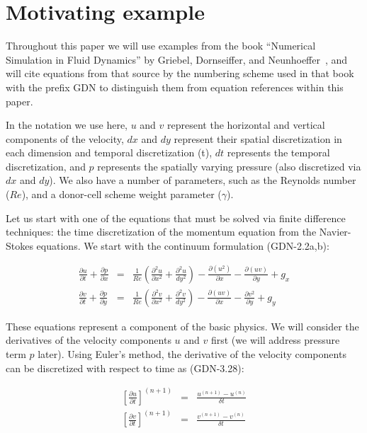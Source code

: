 \section{Motivating example}

Throughout this paper we will use examples from the book ``Numerical
Simulation in Fluid Dynamics'' by Griebel, Dornseiffer, and
Neunhoeffer~\cite{griebel98}, and will cite equations from that source
by the numbering scheme used in that book with the prefix GDN to distinguish
them from equation references within this paper.  

In the notation we use here, $u$ and $v$ represent the horizontal and
vertical components of the velocity, $dx$ and $dy$ represent their
spatial discretization in each dimension and temporal discretization
(t), $dt$ represents the temporal discretization, and $p$ represents
the spatially varying pressure (also discretized via $dx$ and $dy$).
We also have a number of parameters, such as the Reynolds number ($Re$),
and a donor-cell scheme weight parameter ($\gamma$).

Let us start with one of the equations that must be solved via finite
difference techniques: the time discretization of the momentum
equation from the Navier-Stokes equations.  We start with the
continuum formulation (GDN-2.2a,b):

\begin{eqnarray}
\frac{\partial u}{\partial t} + \frac{\partial p}{\partial x} & = & \frac{1}{Re} \left(\frac{\partial^2 u}{\partial x^2} + \frac{\partial^2 u}{dy^2}\right) - \frac{\partial(u^2)}{\partial x} - \frac{\partial(uv)}{\partial y} + g_x \nonumber \\
\frac{\partial v}{\partial t} + \frac{\partial p}{\partial y} & = & \frac{1}{Re} \left(\frac{\partial^2 v}{\partial x^2} + \frac{\partial^2 v}{dy^2}\right) - \frac{\partial(uv)}{\partial x} - \frac{\partial v^2}{\partial y} + g_y
\end{eqnarray}

These equations represent a component of the basic physics.  
We will consider the derivatives of the velocity
components $u$ and $v$ first (we will address pressure term $p$ later).  Using Euler's
method, the derivative of the velocity components can be discretized
with respect to time as (GDN-3.28):

\begin{eqnarray}
\label{eq:uv-time-discretization}
\left[ \frac{\partial u}{\partial t} \right]^{(n+1)} & = & \frac{u^{(n+1)} - u^{(n)}}{\delta t} \nonumber \\
\left[ \frac{\partial v}{\partial t} \right]^{(n+1)} & = & \frac{v^{(n+1)} - v^{(n)}}{\delta t}
\end{eqnarray}

